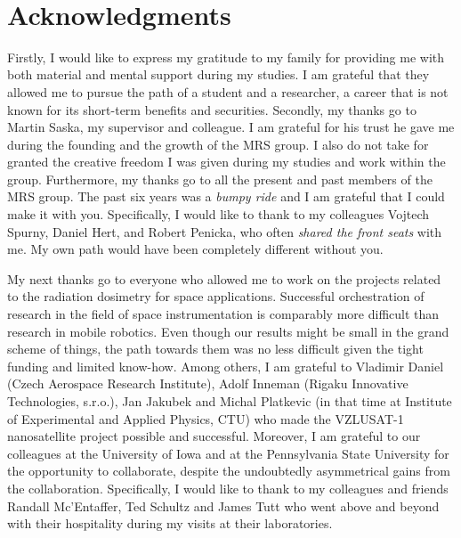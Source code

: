 
~\vfill{}

\section*{Acknowledgments}

Firstly, I would like to express my gratitude to my family for providing me with both material and mental support during my studies.
I am grateful that they allowed me to pursue the path of a student and a researcher, a career that is not known for its short-term benefits and securities.
Secondly, my thanks go to Martin Saska, my supervisor and colleague.
I am grateful for his trust he gave me during the founding and the growth of the MRS group.
I also do not take for granted the creative freedom I was given during my studies and work within the group.
Furthermore, my thanks go to all the present and past members of the MRS group.
The past six years was a \emph{bumpy ride} and I am grateful that I could make it with you.
Specifically, I would like to thank to my colleagues Vojtech Spurny, Daniel Hert, and Robert Penicka, who often \emph{shared the front seats} with me.
My own path would have been completely different without you.

My next thanks go to everyone who allowed me to work on the projects related to the radiation dosimetry for space applications.
Successful orchestration of research in the field of space instrumentation is comparably more difficult than research in mobile robotics.
Even though our results might be small in the grand scheme of things, the path towards them was no less difficult given the tight funding and limited know-how.
Among others, I am grateful to Vladimir Daniel (Czech Aerospace Research Institute), Adolf Inneman (Rigaku Innovative Technologies, s.r.o.), Jan Jakubek and Michal Platkevic (in that time at Institute of Experimental and Applied Physics, CTU) who made the VZLUSAT-1 nanosatellite project possible and successful.
Moreover, I am grateful to our colleagues at the University of Iowa and at the Pennsylvania State University for the opportunity to collaborate, despite the undoubtedly asymmetrical gains from the collaboration.
Specifically, I would like to thank to my colleagues and friends Randall Mc'Entaffer, Ted Schultz and James Tutt who went above and beyond with their hospitality during my visits at their laboratories.

